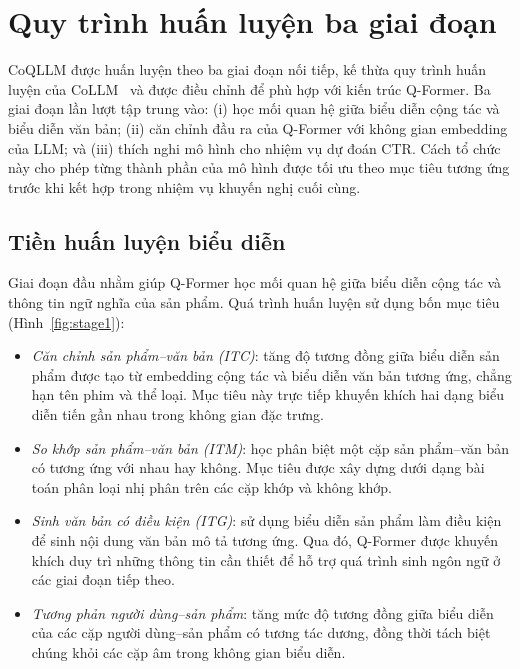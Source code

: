 \section{Quy trình huấn luyện ba giai đoạn}
\label{sec:ba-giai-doan}

CoQLLM được huấn luyện theo ba giai đoạn nối tiếp, kế thừa quy trình huấn luyện của
CoLLM~\cite{collm2023} và được điều chỉnh để phù hợp với kiến trúc Q-Former. Ba giai đoạn lần
lượt tập trung vào: (i) học mối quan hệ giữa biểu diễn cộng tác và biểu diễn văn bản; (ii) căn
chỉnh đầu ra của Q-Former với không gian embedding của LLM; và (iii) thích nghi mô hình cho
nhiệm vụ dự đoán CTR. Cách tổ chức này cho phép từng thành phần của mô hình được tối ưu theo mục
tiêu tương ứng trước khi kết hợp trong nhiệm vụ khuyến nghị cuối cùng.

\subsection{Tiền huấn luyện biểu diễn}
\label{ssec:stage1}

Giai đoạn đầu nhằm giúp Q-Former học mối quan hệ giữa biểu diễn cộng tác và thông tin ngữ nghĩa
của sản phẩm. Quá trình huấn luyện sử dụng bốn mục tiêu (Hình~\ref{fig:stage1}):

\begin{itemize}
    \item \textit{Căn chỉnh sản phẩm--văn bản (ITC)}: tăng độ tương đồng giữa biểu diễn sản
    phẩm được tạo từ embedding cộng tác và biểu diễn văn bản tương ứng, chẳng hạn tên phim và
    thể loại. Mục tiêu này trực tiếp khuyến khích hai dạng biểu diễn tiến gần nhau trong không
    gian đặc trưng.

    \item \textit{So khớp sản phẩm--văn bản (ITM)}: học phân biệt một cặp sản phẩm--văn bản có
    tương ứng với nhau hay không. Mục tiêu được xây dựng dưới dạng bài toán phân loại nhị phân
    trên các cặp khớp và không khớp.

    \item \textit{Sinh văn bản có điều kiện (ITG)}: sử dụng biểu diễn sản phẩm làm điều kiện để
    sinh nội dung văn bản mô tả tương ứng. Qua đó, Q-Former được khuyến khích duy trì những
    thông tin cần thiết để hỗ trợ quá trình sinh ngôn ngữ ở các giai đoạn tiếp theo.

    \item \textit{Tương phản người dùng--sản phẩm}: tăng mức độ tương đồng giữa biểu diễn của
    các cặp người dùng--sản phẩm có tương tác dương, đồng thời tách biệt chúng khỏi các cặp âm
    trong không gian biểu diễn.
\end{itemize}

